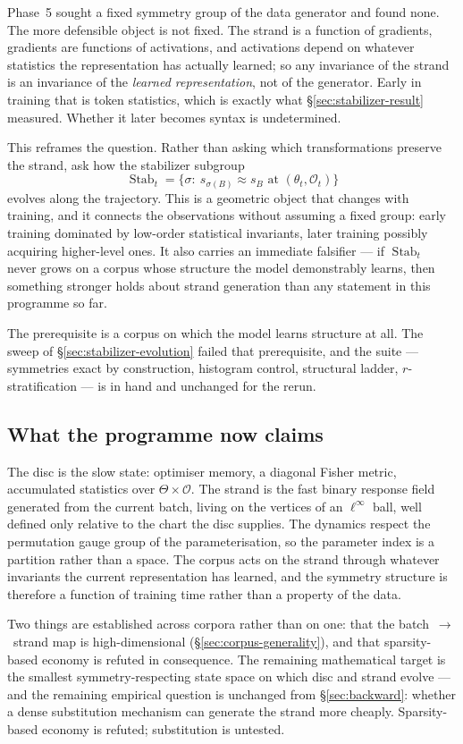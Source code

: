 Phase~5 sought a fixed symmetry group of the data generator and found none.
The more defensible object is not fixed. The strand is a function of gradients,
gradients are functions of activations, and activations depend on whatever
statistics the representation has actually learned; so any invariance of the
strand is an invariance of the \emph{learned representation}, not of the
generator. Early in training that is token statistics, which is exactly what
\S\ref{sec:stabilizer-result} measured. Whether it later becomes syntax is
undetermined.

This reframes the question. Rather than asking which transformations preserve
the strand, ask how the stabilizer subgroup
\[
\operatorname{Stab}_t=\{\sigma:\ s_{\sigma(B)}\approx s_B \text{ at }
(\theta_t,\mathcal{O}_t)\}
\]
evolves along the trajectory. This is a geometric object that changes with
training, and it connects the observations without assuming a fixed group: early
training dominated by low-order statistical invariants, later training possibly
acquiring higher-level ones. It also carries an immediate falsifier --- if
$\operatorname{Stab}_t$ never grows on a corpus whose structure the model
demonstrably learns, then something stronger holds about strand generation than
any statement in this programme so far.

The prerequisite is a corpus on which the model learns structure at all. The
sweep of \S\ref{sec:stabilizer-evolution} failed that prerequisite, and the
suite --- symmetries exact by construction, histogram control, structural
ladder, $r$-stratification --- is in hand and unchanged for the rerun.

\subsection{What the programme now claims}
\label{sec:claims}

The disc is the slow state: optimiser memory, a diagonal Fisher metric,
accumulated statistics over $\Theta\times\mathcal{O}$. The strand is the fast
binary response field generated from the current batch, living on the vertices
of an $\ell^\infty$ ball, well defined only relative to the chart the disc
supplies. The dynamics respect the permutation gauge group of the
parameterisation, so the parameter index is a partition rather than a space.
The corpus acts on the strand through whatever invariants the current
representation has learned, and the symmetry structure is therefore a function
of training time rather than a property of the data.

Two things are established across corpora rather than on one: that the
batch~$\to$~strand map is high-dimensional (\S\ref{sec:corpus-generality}), and
that sparsity-based economy is refuted in consequence. The remaining
mathematical target is the smallest symmetry-respecting state space on which
disc and strand evolve --- and the remaining empirical question is unchanged
from \S\ref{sec:backward}: whether a dense substitution mechanism can generate
the strand more cheaply. Sparsity-based economy is refuted; substitution is
untested.
